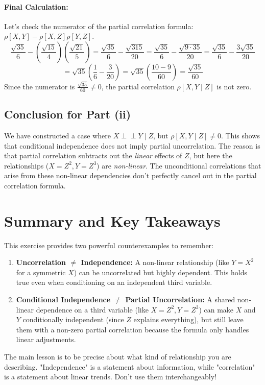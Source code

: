 \documentclass[11pt,a4paper]{article}
\begin{document}
\paragraph{Final Calculation:}
Let's check the numerator of the partial correlation formula: $\rho[X, Y] - \rho[X, Z]\rho[Y, Z]$.
\[
\frac{\sqrt{35}}{6} - \left(\frac{\sqrt{15}}{4}\right) \left(\frac{\sqrt{21}}{5}\right) = \frac{\sqrt{35}}{6} - \frac{\sqrt{315}}{20} = \frac{\sqrt{35}}{6} - \frac{\sqrt{9 \cdot 35}}{20} = \frac{\sqrt{35}}{6} - \frac{3\sqrt{35}}{20}
\]
\[
= \sqrt{35} \left( \frac{1}{6} - \frac{3}{20} \right) = \sqrt{35} \left( \frac{10 - 9}{60} \right) = \frac{\sqrt{35}}{60}
\]
Since the numerator is $\frac{\sqrt{35}}{60} \neq 0$, the partial correlation $\rho[X, Y \mid Z]$ is not zero.

\subsection{Conclusion for Part (ii)}
We have constructed a case where $X \perp\perp Y \mid Z$, but $\rho[X, Y \mid Z] \neq 0$. This shows that conditional independence does not imply partial uncorrelation. The reason is that partial correlation subtracts out the \emph{linear} effects of $Z$, but here the relationships ($X=Z^2, Y=Z^3$) are \emph{non-linear}. The unconditional correlations that arise from these non-linear dependencies don't perfectly cancel out in the partial correlation formula.

\section{Summary and Key Takeaways}

This exercise provides two powerful counterexamples to remember:
\begin{enumerate}
    \item \textbf{Uncorrelation $\neq$ Independence:} A non-linear relationship (like $Y=X^2$ for a symmetric $X$) can be uncorrelated but highly dependent. This holds true even when conditioning on an independent third variable.
    \item \textbf{Conditional Independence $\neq$ Partial Uncorrelation:} A shared non-linear dependence on a third variable (like $X=Z^2, Y=Z^3$) can make $X$ and $Y$ conditionally independent (since $Z$ explains everything), but still leave them with a non-zero partial correlation because the formula only handles linear adjustments.
\end{enumerate}
The main lesson is to be precise about what kind of relationship you are describing. "Independence" is a statement about information, while "correlation" is a statement about linear trends. Don't use them interchangeably!
\end{document}
